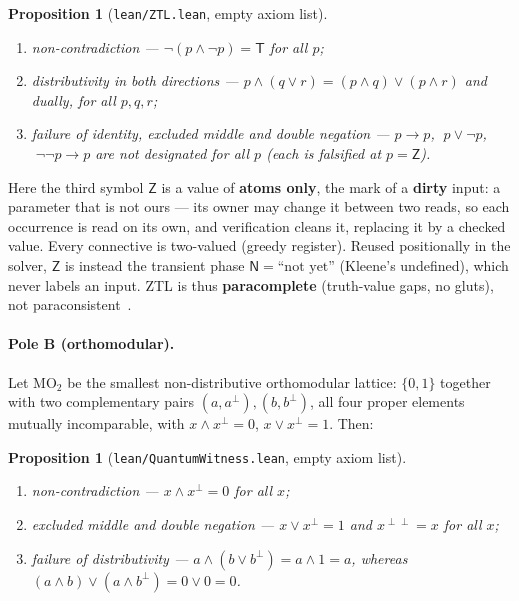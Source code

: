 \documentclass[11pt]{article}
\newtheorem{prop}[lem]{Proposition}
\theoremstyle{remark}
\newcommand{\T}{\mathsf{T}}
\newcommand{\Zmark}{\mathsf{Z}}
\newcommand{\Nph}{\mathsf{N}}
\begin{document}
\begin{prop}[\texttt{lean/ZTL.lean}, empty axiom list]\label{propA}
\leavevmode
\begin{enumerate}
\item[(i)] \emph{non-contradiction} --- $\neg(p \wedge \neg p) = \T$ for all $p$;
\item[(ii)] \emph{distributivity in both directions} ---
$p \wedge (q \vee r) = (p\wedge q) \vee (p\wedge r)$ and dually, for all $p,q,r$;
\item[(iii)] \emph{failure of identity, excluded middle and double negation} ---
$p \to p$, $\;p \vee \neg p$, $\;\neg\neg p \to p$ are not designated for all
$p$ (each is falsified at $p = \Zmark$).
\end{enumerate}
\end{prop}

Here the third symbol $\Zmark$ is a value of \textbf{atoms only}, the mark
of a \textbf{dirty} input: a parameter that is not ours --- its owner may
change it between two reads, so each occurrence is read on its own, and
verification cleans it, replacing it by a checked value. Every connective
is two-valued (greedy register). Reused positionally in the solver,
$\Zmark$ is instead the transient phase
$\Nph = \text{``not yet''}$ (Kleene's undefined), which never labels an input.
ZTL is thus \textbf{paracomplete} (truth-value gaps, no gluts), not
paraconsistent~\cite{ztl}.

\paragraph{Pole B (orthomodular).} Let $\mathrm{MO}_2$ be the smallest
non-distributive orthomodular lattice: $\{0, 1\}$ together with two
complementary pairs $(a, a^{\perp}), (b, b^{\perp})$, all four proper elements
mutually incomparable, with $x \wedge x^{\perp} = 0$, $x \vee x^{\perp} = 1$.
Then:

\begin{prop}[\texttt{lean/QuantumWitness.lean}, empty axiom list]\label{propB}
\leavevmode
\begin{enumerate}
\item[(i)] \emph{non-contradiction} --- $x \wedge x^{\perp} = 0$ for all $x$;
\item[(ii)] \emph{excluded middle and double negation} ---
$x \vee x^{\perp} = 1$ and $x^{\perp\perp} = x$ for all $x$;
\item[(iii)] \emph{failure of distributivity} ---
$a \wedge (b \vee b^{\perp}) = a \wedge 1 = a$, whereas
$(a\wedge b) \vee (a\wedge b^{\perp}) = 0 \vee 0 = 0$.
\end{enumerate}
\end{prop}
\end{document}
